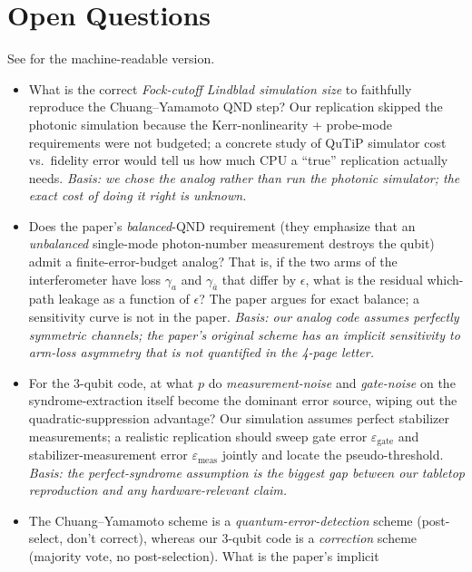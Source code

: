 \documentclass[11pt]{article}
\begin{document}
\section{Open Questions}
\label{sec:openq}
See  for the machine-readable version.
\begin{itemize}
    \item[\textbf{Q1}] What is the correct \emph{Fock-cutoff Lindblad
    simulation size} to faithfully reproduce the Chuang--Yamamoto QND
    step? Our replication skipped the photonic simulation because the
    Kerr-nonlinearity + probe-mode requirements were not budgeted; a
    concrete study of QuTiP simulator cost vs.\ fidelity error would tell
    us how much CPU a ``true'' replication actually needs.
    \emph{Basis: we chose the analog rather than run the photonic
    simulator; the exact cost of doing it right is unknown.}
    \item[\textbf{Q2}] Does the paper's \emph{balanced}-QND requirement
    (they emphasize that an \emph{unbalanced} single-mode photon-number
    measurement destroys the qubit) admit a finite-error-budget analog?
    That is, if the two arms of the interferometer have loss $\gamma_a$
    and $\gamma_{\bar a}$ that differ by $\epsilon$, what is the residual
    which-path leakage as a function of $\epsilon$? The paper argues for
    exact balance; a sensitivity curve is not in the paper.
    \emph{Basis: our analog code assumes perfectly symmetric channels;
    the paper's original scheme has an implicit sensitivity to arm-loss
    asymmetry that is not quantified in the 4-page letter.}
    \item[\textbf{Q3}] For the 3-qubit code, at what $p$ do
    \emph{measurement-noise} and \emph{gate-noise} on the syndrome-extraction
    itself become the dominant error source, wiping out the
    quadratic-suppression advantage?  Our simulation assumes perfect
    stabilizer measurements; a realistic replication should sweep gate
    error $\varepsilon_{\text{gate}}$ and stabilizer-measurement error
    $\varepsilon_{\text{meas}}$ jointly and locate the pseudo-threshold.
    \emph{Basis: the perfect-syndrome assumption is the biggest gap
    between our tabletop reproduction and any hardware-relevant claim.}
    \item[\textbf{Q4}] The Chuang--Yamamoto scheme is a
    \emph{quantum-error-detection} scheme (post-select, don't correct),
    whereas our 3-qubit code is a \emph{correction} scheme (majority
    vote, no post-selection).  What is the paper's implicit

\end{itemize}
\end{document}
